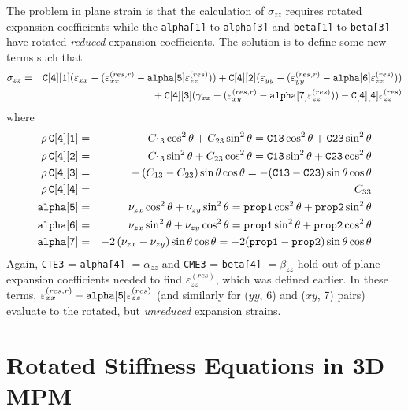 \documentclass[11pt]{book}
\def\a#1{\alpha_{#1}}
\def\b#1{\beta_{#1}}
\def\code#1{{\small\tt #1}}
\def\e#1{\varepsilon_{#1}}
\def\er#1{\varepsilon_{#1}^{(res)}}
\def\err#1{\varepsilon_{#1}^{(res,r)}}
\def\g#1{\gamma_{#1}}
\def\s#1{\sigma_{#1}}
\def\v#1{\nu_{#1}}
\begin{document}
The problem in plane strain is that the calculation of $\s{zz}$ requires rotated expansion coefficients while the \code{alpha[1]} to \code{alpha[3]}  and \code{beta[1]} to \code{beta[3]} have rotated {\em reduced\/} expansion coefficients. The solution is to define some new terms such that
\begin{eqnarray}
     \s{zz} & = & \code{C[4][1]} (\e{xx} -(\err{xx}-\code{alpha[5]}\er{zz}))
                         +  \code{C[4][2]}(\e{yy} -(\err{yy}-\code{alpha[6]}\er{zz})) 
     \nonumber \\
     && \qquad\qquad\mbox{}
                 + \code{C[4][3]}(\g{xx}-(\err{xy}-\code{alpha[7]}\er{zz}))  - \code{C[4][4]} \er{zz}
\end{eqnarray}
where
\begin{eqnarray}
 \rho\thinspace \code{C[4][1]} & = &C_{13}\cos^2\theta + C_{23}\sin^2\theta
            = \code{C13}\cos^2\theta + \code{C23}\sin^2\theta  \\
 \rho\thinspace \code{C[4][2]} & = &C_{13}\sin^2\theta + C_{23}\cos^2\theta
             = \code{C13}\sin^2\theta + \code{C23}\cos^2\theta  \\
 \rho\thinspace \code{C[4][3]} & = & - \left(C_{13} - C_{23}\right)\sin\theta\cos\theta
             =  -(\code{C13}-\code{C23})\sin\theta\cos\theta \\
 \rho\thinspace \code{C[4][4]} & = & C_{33}  \\
  \code{alpha[5]} & = &\v{zx}\cos^2\theta + \v{zy}\sin^2\theta
         = \code{prop1}\cos^2\theta + \code{prop2}\sin^2\theta  \\
  \code{alpha[6]} & = &\v{zx}\sin^2\theta + \v{zy}\cos^2\theta
        = \code{prop1}\sin^2\theta + \code{prop2}\cos^2\theta  \\
  \code{alpha[7]} & = & - 2\left(\v{zx} - \v{zy}\right)\sin\theta\cos\theta 
       =  -2(\code{prop1}-\code{prop2})\sin\theta\cos\theta
\end{eqnarray}
Again, \code{CTE3} = \code{alpha[4]} $=\a{zz}$ and \code{CME3} = \code{beta[4]} $=\b{zz}$ hold out-of-plane expansion coefficients needed to find $\er{zz}$, which was defined earlier.
In these terms, $\err{xx}-\code{alpha[5]}\er{zz}$ (and similarly for ($yy$, 6) and ($xy$, 7) pairs) evaluate to the rotated, but {\em unreduced\/} expansion strains.

\section{Rotated Stiffness Equations in 3D MPM}
\end{document}
